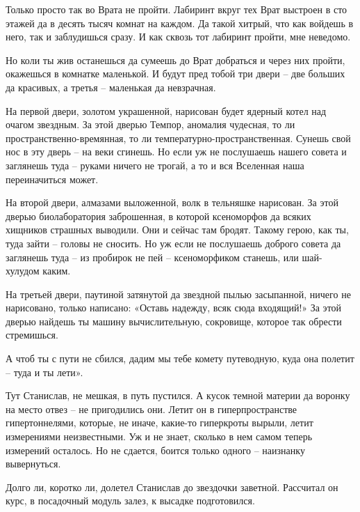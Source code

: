 \documentclass[ebook,oneside,final,openright]{memoir}
\begin{document}
\par
Только просто так во Врата не пройти. Лабиринт вкруг тех Врат выстроен в сто этажей да в десять тысяч комнат на каждом. Да такой хитрый, что как войдешь в него, так и заблудишься сразу. И как сквозь тот лабиринт пройти, мне неведомо.\par
\par
Но коли ты жив останешься да сумеешь до Врат добраться и через них пройти, окажешься в комнатке маленькой. И будут пред тобой три двери – две больших да красивых, а третья – маленькая да невзрачная.\par
\par
На первой двери, золотом украшенной, нарисован будет ядерный котел над очагом звездным. За этой дверью Темпор, аномалия чудесная, то ли пространственно-времянная, то ли температурно-пространственная. Сунешь свой нос в эту дверь – на веки сгинешь. Но если уж не послушаешь нашего совета и заглянешь туда – руками ничего не трогай, а то и вся Вселенная наша переиначиться может.\par
\par
На второй двери, алмазами выложенной, волк в тельняшке нарисован. За этой дверью биолаборатория заброшенная, в которой ксеноморфов да всяких хищников страшных выводили. Они и сейчас там бродят. Такому герою, как ты, туда зайти – головы не сносить. Но уж если не послушаешь доброго совета да заглянешь туда – из пробирок не пей – ксеноморфиком станешь, или шай-хулудом каким.\par
\par
На третьей двери, паутиной затянутой да звездной пылью засыпанной, ничего не нарисовано, только написано: «Оставь надежду, всяк сюда входящий!» За этой дверью найдешь ты машину вычислительную, сокровище, которое так обрести стремишься.\par
\par
А чтоб ты с пути не сбился, дадим мы тебе комету путеводную, куда она полетит – туда и ты лети».\par
\par
Тут Станислав, не мешкая, в путь пустился. А кусок темной материи да воронку на место отвез – не пригодились они. Летит он в гиперпространстве гипертоннелями, которые, не иначе, какие-то гиперкроты вырыли, летит измерениями неизвестными. Уж и не знает, сколько в нем самом теперь измерений осталось. Но не сдается, боится только одного – наизнанку вывернуться.\par
\par
Долго ли, коротко ли, долетел Станислав до звездочки заветной. Рассчитал он курс, в посадочный модуль залез, к высадке подготовился.\par
\end{document}
